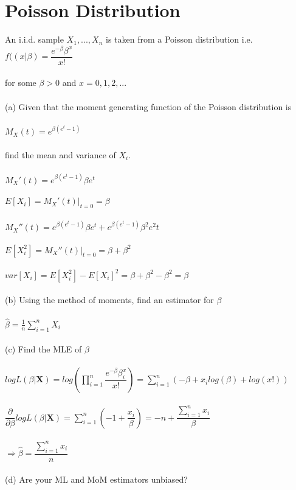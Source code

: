 \documentclass{article}
\begin{document}
\section{Poisson Distribution}
An i.i.d. sample $X_1,...,X_n$ is taken from a Poisson distribution i.e.\\
$f((x|\beta)=\dfrac{e^{-\beta}\beta^x}{x!}$\\\\
for some $\beta>0$ and $x=0,1,2,...$\\\\
(a) Given that the moment generating function of the Poisson distribution is\\\\
$M_X(t)=e^{\beta(e^t-1)}$\\\\
find the mean and variance of $X_i$.\\\\
$M_X'(t)=e^{\beta(e^t-1)}\beta e^t$\\\\
$E[X_i]=M_X'(t)|_{t=0}=\beta$\\\\
$M_X''(t)=e^{\beta(e^t-1)}\beta e^t+e^{\beta(e^t-1)}\beta^2e^2t$\\\\
$E[X_i^2]=M_X''(t)|_{t=0}=\beta+\beta^2$\\\\
$var[X_i]=E[X_i^2]-E[X_i]^2=\beta+\beta^2-\beta^2=\beta$\\\\
(b) Using the method of moments, find an estimator for $\beta$\\\\
$\hat{\beta}=\frac{1}{n}\sum_{i=1}^nX_i$\\\\
(c) Find the MLE of $\beta$\\\\
$logL(\beta|\textbf{X})=log(\prod_{i=1}^n\dfrac{e^{-\beta}\beta^x_i}{x!})=\sum_{i=1}^n(-\beta+x_ilog(\beta)+log(x!))$\\\\
$\dfrac{\partial}{\partial\beta}logL(\beta|\textbf{X})=\sum_{i=1}^n(-1+\dfrac{x_i}{\beta})=-n+\dfrac{\sum_{i=1}^nx_i}{\beta}$\\\\
$\Rightarrow \hat{\beta}=\dfrac{\sum_{i=1}^nx_i}{n}$\\\\
(d) Are your ML and MoM estimators unbiased?\\\\
\end{document}
